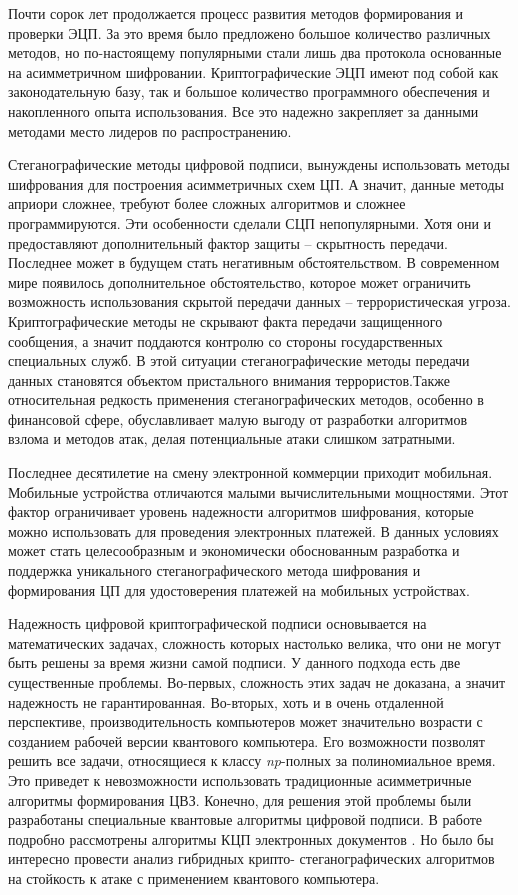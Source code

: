 \par \hspace{1.25cm}Почти сорок лет продолжается процесс развития методов формирования и проверки ЭЦП. За это время было предложено большое количество различных методов, но по-настоящему популярными стали лишь два протокола основанные на асимметричном шифровании. Криптографические ЭЦП имеют под собой как законодательную базу, так и большое количество программного обеспечения и накопленного опыта использования. Все это надежно закрепляет за данными методами место лидеров по распространению. 

\par Стеганографические методы цифровой подписи, вынуждены использовать методы шифрования для построения асимметричных схем ЦП. А значит, данные методы априори сложнее, требуют более сложных алгоритмов и сложнее программируются. Эти особенности сделали СЦП непопулярными. Хотя они и предоставляют дополнительный фактор защиты -- скрытность передачи. Последнее может в будущем стать негативным обстоятельством. В современном мире появилось дополнительное обстоятельство, которое может ограничить возможность использования скрытой передачи данных -- террористическая угроза. Криптографические методы не скрывают факта передачи защищенного сообщения, а значит поддаются контролю со стороны государственных специальных служб. В этой ситуации стеганографические методы передачи данных становятся объектом пристального внимания террористов.Также относительная редкость применения стеганографических методов, особенно в финансовой сфере,  обуславливает малую выгоду от разработки алгоритмов взлома и методов атак, делая потенциальные атаки слишком затратными. 
\par Последнее десятилетие на смену электронной коммерции приходит мобильная. Мобильные устройства отличаются малыми вычислительными мощностями. Этот фактор ограничивает уровень надежности алгоритмов шифрования, которые можно использовать для проведения электронных платежей. В данных условиях может стать целесообразным и экономически обоснованным разработка и поддержка уникального стеганографического метода шифрования и формирования ЦП для удостоверения платежей на мобильных устройствах. 
\par Надежность цифровой криптографической подписи основывается на математических  задачах, сложность которых настолько велика, что они не могут быть решены за время жизни самой подписи. У данного подхода есть две существенные проблемы. Во-первых, сложность этих задач не доказана, а значит надежность не гарантированная. Во-вторых, хоть и в очень отдаленной перспективе, производительность компьютеров может значительно возрасти с созданием рабочей версии квантового компьютера. Его возможности позволят решить все задачи, относящиеся к классу \textit{np}-полных за полиномиальное время. Это приведет к невозможности использовать традиционные асимметричные алгоритмы формирования ЦВЗ. Конечно, для решения этой проблемы были разработаны специальные квантовые алгоритмы цифровой подписи. В работе подробно рассмотрены алгоритмы КЦП электронных документов \cite{yin2015}. Но было бы интересно провести анализ гибридных крипто- стеганографических алгоритмов на стойкость к атаке с применением квантового компьютера.
\par  